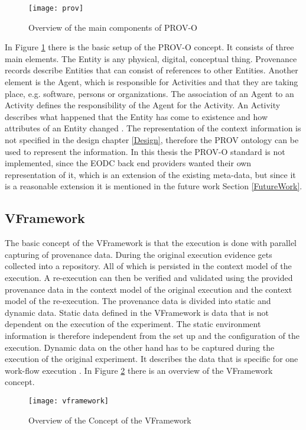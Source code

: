\documentclass[draft,final]{vutinfth} %
\begin{document}
\begin{figure}[h]
	\centering
	\texttt{[image: prov]}
	\caption{Overview of the main components of PROV-O \cite{733f89c65e4844f9aabcae1c276a5602}}
	\label{fig:prov} %
\end{figure}

In Figure \ref{fig:prov} there is the basic setup of the PROV-O concept. It consists of three main elements. The Entity is any physical, digital, conceptual thing. Provenance records describe Entities that can consist of references to other Entities. Another element is the Agent, which is responsible for Activities and that they are taking place, e.g. software, persons or organizations. The association of an Agent to an Activity defines the responsibility of the Agent for the Activity. An Activity describes what happened that the Entity has come to existence and how attributes of an Entity changed \cite{f06eee9045b445be89cf07100b3ce05c}. The representation of the context information is not specified in the design chapter \ref{Design}, therefore the PROV ontology can be used to represent the information. In this thesis the PROV-O standard is not implemented, since the EODC back end providers wanted their own representation of it, which is an extension of the existing meta-data, but since it is a reasonable extension it is mentioned in the future work Section \ref{FutureWork}.
\subsection{VFramework}

The basic concept of the VFramework is that the execution is done with parallel capturing of provenance data. During the original execution evidence gets collected into a repository. All of which is persisted in the context model of the execution. A re-execution can then be verified and validated using the provided provenance data in the context model of the original execution and the context model of the re-execution. The provenance data is divided into static and dynamic data. Static data defined in the VFramework is data that is not dependent on the execution of the experiment. The static environment information is therefore independent from the set up and the configuration of the execution. Dynamic data on the other hand has to be captured during the execution of the original experiment. It describes the data that is specific for one work-flow execution \cite{Miksa2013FrameworkFV}. 
In Figure \ref{fig:vframework} there is an overview of the VFramework concept.  
\begin{figure}[h]
	\centering
	\texttt{[image: vframework]}
	\caption{Overview of the Concept of the VFramework \cite{Miksa2013FrameworkFV}}
	\label{fig:vframework} %
\end{figure}
\end{document}
